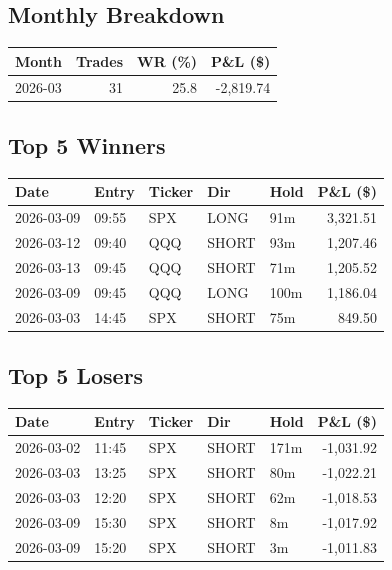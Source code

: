 \documentclass[11pt,a4paper,twoside]{article}
\begin{document}
\subsection*{Monthly Breakdown}
\noindent\begin{center}
\begin{tabular}{>{\color{txtmain}}l rrr}
\toprule
\rowcolor{cardbg}
\textbf{Month} & \textbf{Trades} & \textbf{WR (\%)} & \textbf{P\&L (\$)} \\
\midrule
2026-03 & 31 & 25.8 & \textcolor{lossred}{-2,819.74} \\
\bottomrule
\end{tabular}
\end{center}
\subsection*{Top 5 Winners}
\noindent\begin{center}
\begin{tabular}{>{\color{txtmain}}l llll r}
\toprule
\rowcolor{cardbg}
\textbf{Date} & \textbf{Entry} & \textbf{Ticker} & \textbf{Dir} & \textbf{Hold} & \textbf{P\&L (\$)} \\
\midrule
2026-03-09 & 09:55 & SPX & LONG & 91m & \textcolor{wingreen}{3,321.51} \\
2026-03-12 & 09:40 & QQQ & SHORT & 93m & \textcolor{wingreen}{1,207.46} \\
2026-03-13 & 09:45 & QQQ & SHORT & 71m & \textcolor{wingreen}{1,205.52} \\
2026-03-09 & 09:45 & QQQ & LONG & 100m & \textcolor{wingreen}{1,186.04} \\
2026-03-03 & 14:45 & SPX & SHORT & 75m & \textcolor{wingreen}{849.50} \\
\bottomrule
\end{tabular}
\end{center}
\subsection*{Top 5 Losers}
\noindent\begin{center}
\begin{tabular}{>{\color{txtmain}}l llll r}
\toprule
\rowcolor{cardbg}
\textbf{Date} & \textbf{Entry} & \textbf{Ticker} & \textbf{Dir} & \textbf{Hold} & \textbf{P\&L (\$)} \\
\midrule
2026-03-02 & 11:45 & SPX & SHORT & 171m & \textcolor{lossred}{-1,031.92} \\
2026-03-03 & 13:25 & SPX & SHORT & 80m & \textcolor{lossred}{-1,022.21} \\
2026-03-03 & 12:20 & SPX & SHORT & 62m & \textcolor{lossred}{-1,018.53} \\
2026-03-09 & 15:30 & SPX & SHORT & 8m & \textcolor{lossred}{-1,017.92} \\
2026-03-09 & 15:20 & SPX & SHORT & 3m & \textcolor{lossred}{-1,011.83} \\
\bottomrule
\end{tabular}
\end{center}
\clearpage
\end{document}
